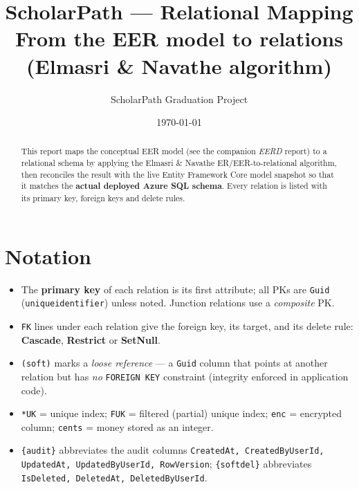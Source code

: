 \documentclass[11pt,a4paper]{article}
\title{\textbf{ScholarPath --- Relational Mapping}\\[2pt]
\large From the EER model to relations (Elmasri \& Navathe algorithm)}
\author{ScholarPath Graduation Project}
\date{\today}
\begin{document}
\maketitle\thispagestyle{fancy}

\begin{abstract}\noindent
This report maps the conceptual EER model (see the companion \emph{EERD} report)
to a relational schema by applying the Elmasri \& Navathe ER/EER-to-relational
algorithm, then reconciles the result with the live Entity Framework Core model
snapshot so that it matches the \textbf{actual deployed Azure SQL schema}. Every
relation is listed with its primary key, foreign keys and delete rules.
\end{abstract}

\tableofcontents\bigskip

\section{Notation}
\begin{itemize}
  \item The \textbf{primary key} of each relation is its first attribute; all PKs
        are \texttt{Guid} (\texttt{uniqueidentifier}) unless noted. Junction
        relations use a \emph{composite} PK.
  \item \texttt{FK} lines under each relation give the foreign key, its target,
        and its delete rule: \textbf{Cascade}, \textbf{Restrict} or \textbf{SetNull}.
  \item \texttt{(soft)} marks a \emph{loose reference} --- a \texttt{Guid} column
        that points at another relation but has \emph{no} \texttt{FOREIGN KEY}
        constraint (integrity enforced in application code).
  \item \texttt{*UK} = unique index; \texttt{FUK} = filtered (partial) unique index;
        \texttt{enc} = encrypted column; \texttt{cents} = money stored as an integer.
  \item \texttt{\{audit\}} abbreviates the audit columns \texttt{CreatedAt,
        CreatedByUserId, UpdatedAt, UpdatedByUserId, RowVersion};
        \texttt{\{softdel\}} abbreviates \texttt{IsDeleted, DeletedAt, DeletedByUserId}.
\end{itemize}
\end{document}
